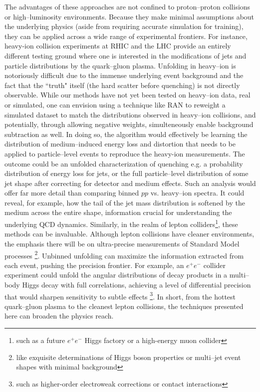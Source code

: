         The advantages of these approaches are not confined to proton--proton collisions or high--luminosity environments.
        Because they make minimal assumptions about the underlying physics (aside from requiring accurate simulation for training), they can be applied across a wide range of experimental frontiers.
        For instance, heavy-ion collision experiments at RHIC and the LHC provide an entirely different testing ground where one is interested in the modifications of jets and particle distributions by the quark--gluon plasma.
        Unfolding in heavy--ion is notoriously difficult due to the immense underlying event background and the fact that the ``truth" itself (the hard scatter before quenching) is not directly observable.
        While our methods have not yet been tested on heavy--ion data, real or simulated, one can envision using a technique like RAN to reweight a simulated dataset to match the distributions observed in heavy--ion collisions, and potentially, through allowing negative weights, simulteneously enable background subtraction as well.
        In doing so, the algorithm would effectively be learning the distribution of medium--induced energy loss and distortion that needs to be applied to particle--level events to reproduce the heavy-ion measurements.
        The outcome could be an unfolded characterization of quenching e.g. a probability distribution of energy loss for jets, or the full particle--level distribution of some jet shape after correcting for detector and medium effects.
        Such an analysis would offer far more detail than comparing binned $pp$ vs. heavy--ion spectra.
        It could reveal, for example, how the tail of the jet mass distribution is softened by the medium across the entire shape, information crucial for understanding the underlying QCD dynamics.
        Similarly, in the realm of lepton colliders\footnote{such as a future $e^+e^-$ Higgs factory or a high-energy muon collider}, these methods can be invaluable.
        Although lepton collisions have cleaner environments, the emphasis there will be on ultra-precise measurements of Standard Model processes \footnote{like exquisite determinations of Higgs boson properties or multi--jet event shapes with minimal background}.
        Unbinned unfolding can maximize the information extracted from each event, pushing the precision frontier.
        For example, an $e^+e^-$ collider experiment could unfold the angular distributions of decay products in a multi--body Higgs decay with full correlations, achieving a level of differential precision that would sharpen sensitivity to subtle effects \footnote{such as higher-order electroweak corrections or contact interactions }.
        In short, from the hottest quark--gluon plasma to the cleanest lepton collisions, the techniques presented here can broaden the physics reach.

